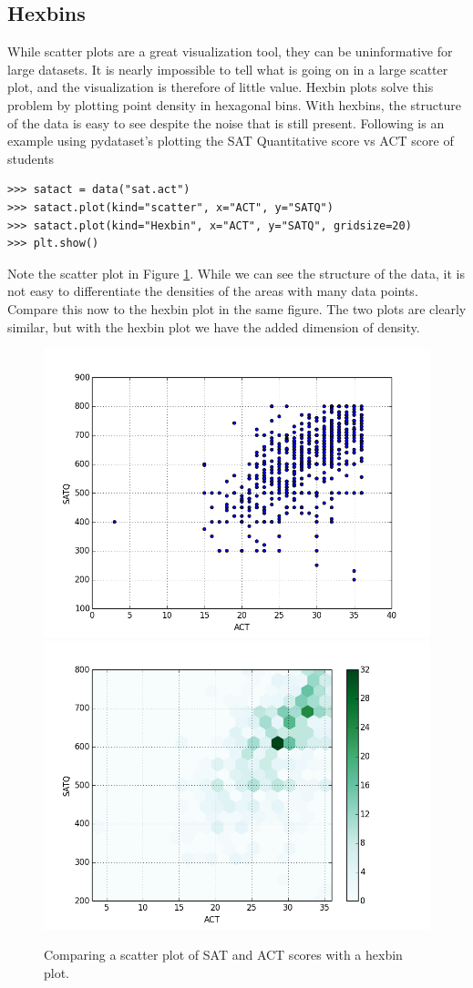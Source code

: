 \subsection*{Hexbins}
While scatter plots are a great visualization tool, they can be uninformative for large datasets.  It is nearly impossible to tell what is going on in a large scatter plot, and the visualization is therefore of little value.  Hexbin plots solve this problem by plotting point density in hexagonal bins.  With hexbins, the structure of the data is easy to see despite the noise that is still present. 
Following is an example using pydataset's  plotting the SAT Quantitative score vs ACT score of students


\begin{lstlisting}
>>> satact = data("sat.act")
>>> satact.plot(kind="scatter", x="ACT", y="SATQ")
>>> satact.plot(kind="Hexbin", x="ACT", y="SATQ", gridsize=20)
>>> plt.show()
\end{lstlisting}

Note the scatter plot in Figure \ref{fig:comp}. While we can see the structure of the data, it is not easy to differentiate the densities of the areas with many data points. Compare this now to the hexbin plot in the same figure.  The two plots are clearly similar, but with the hexbin plot we have the added dimension of density.   
\begin{figure}[H] 
    \centering
    \includegraphics[width=.49\textwidth]{scatter.png}
    \includegraphics[width=.49\textwidth]{hexbin2.png}
    \caption{Comparing a scatter plot of SAT and ACT scores with a hexbin plot.}
    \label{fig:comp}
\end{figure}

